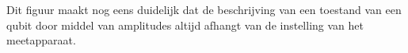 \documentclass[../main.tex]{subfiles}
\begin{document}
\begin{flushleft}
\begin{minipage}{.35\textwidth}
\end{minipage}%
\hfill
\begin{minipage}{.45\textwidth}
\label{fig:twobases}
\end{minipage}
\end{flushleft}


Dit figuur maakt nog eens duidelijk dat de beschrijving van een toestand van een qubit door middel van amplitudes altijd afhangt van de instelling van het meetapparaat.
\end{document}

